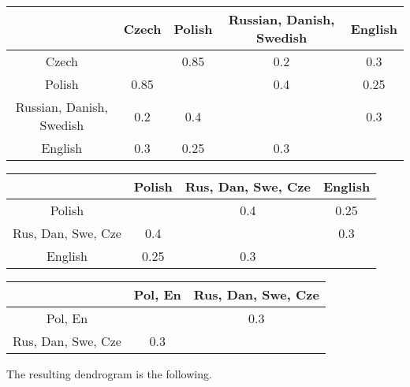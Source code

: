 \documentclass[fontsize=12pt, usenames, dvipsnames, headinclude, headsepline, footinclude, footsepline]{scrartcl}
\begin{document}
\begin{sol}
\begin{enumerate}
      \begin{center}
        \begin{tabular}{@{}c|cccc@{}}
          \toprule
          & Czech & Polish & Russian, Danish, Swedish & English \\ \midrule
          Czech                    &       & 0.85   & \cellcolor{ForestGreen!30}0.2                      & 0.3     \\
          Polish                   & 0.85  &        & 0.4                      & 0.25    \\
          Russian, Danish, Swedish & 0.2   & 0.4    &                          & 0.3     \\
          English                  & 0.3   & 0.25   & 0.3                      &         \\ \bottomrule
        \end{tabular}
      \end{center}

      \begin{center}
        \begin{tabular}{@{}c|ccc@{}}
          \toprule
          & Polish & Rus, Dan, Swe, Cze & English \\ \midrule
          Polish             &        & 0.4                & \cellcolor{ForestGreen!30}0.25    \\
          Rus, Dan, Swe, Cze & 0.4    &                    & 0.3     \\
          English            & 0.25   & 0.3                &         \\ \bottomrule
        \end{tabular}
      \end{center}

      \begin{center}
        \begin{tabular}{@{}c|cc@{}}
          \toprule
          & Pol, En & Rus, Dan, Swe, Cze \\ \midrule
          Pol, En            &         & 0.3                \\
          Rus, Dan, Swe, Cze & 0.3     &                    \\ \bottomrule
        \end{tabular}
      \end{center}
      
      The resulting dendrogram is the following.
      

\end{enumerate}
\end{sol}
\end{document}
